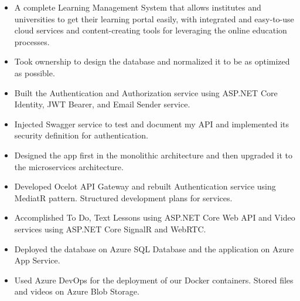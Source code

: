 





\begin{itemize}
    \item A complete Learning Management System that allows institutes and universities to get their learning portal easily, with integrated and easy-to-use cloud services and content-creating tools for leveraging the online education processes.
    \item Took ownership to design the database and normalized it to be as optimized as possible.
    \item Built the Authentication and Authorization service using ASP.NET Core Identity, JWT Bearer, and Email Sender service.
    \item Injected Swagger service to test and document my API and implemented its security definition for authentication.
    \item Designed the app first in the monolithic architecture and then upgraded it to the microservices architecture.
    \item Developed Ocelot API Gateway and rebuilt Authentication service using MediatR pattern. Structured development plans for services.
    \item Accomplished To Do, Text Lessons using ASP.NET Core Web API and Video services using ASP.NET Core SignalR and WebRTC.
    \item Deployed the database on Azure SQL Database and the application on Azure App Service.
    \item Used Azure DevOps for the deployment of our Docker containers. Stored files and videos on Azure Blob Storage.
\end{itemize}

\divider

